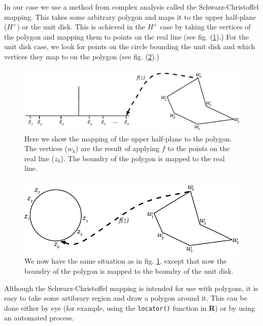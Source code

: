 \documentclass[a4paper,10pt]{amsart}
\newcommand{\sch}{Schwarz-Christoffel }
\begin{document}
In our case we use a method from complex analysis called the \sch mapping. This takes some arbitrary polygon and maps it to the upper half-plane ($H^+$) or the unit disk. This is achieved in the $H^+$ case by taking the vertices of the polygon and mapping them to points on the real line (see fig. (\ref{reallinedia}).) For the unit disk case, we look for points on the circle bounding the unit disk and which vertices they map to on the polygon (see fig. (\ref{unitdiskdia}).)

\begin{figure} [tbp]
\centering
\includegraphics[scale=0.6]{figs/reallinedia.pdf}
\caption{Here we show the mapping of the upper half-plane to the polygon. The vertices ($w_k$) are the result of applying $f$ to the points on the real line ($z_k$). The boundry of the polygon is mapped to the real line.}
\label{reallinedia}
\end{figure}

\begin{figure} [tbp]
\centering
\includegraphics[scale=0.6]{figs/unitdiskdia.pdf}
\caption{We now have the same situation as in fig. \ref{reallinedia}, except that now the boundry of the polygon is mapped to the boundry of the unit disk.}
\label{unitdiskdia}
\end{figure}

Although the \sch mapping is intended for use with polygons, it is easy to take some artibrary region and draw a polygon around it. This can be done either by eye (for example, using the \texttt{locator()} function in \textbf{R}) or by using an automated process.
\end{document}
